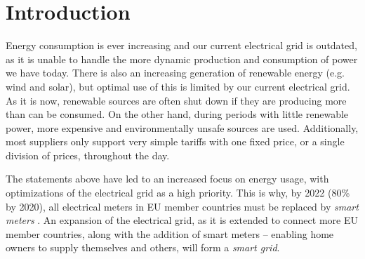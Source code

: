 
\chapter*{Introduction}

Energy consumption is ever increasing and our current electrical grid is outdated, as it is unable to handle the more dynamic production and consumption of power we have today.
There is also an increasing generation of renewable energy (e.g. wind and solar), but optimal use of this is limited by our current electrical grid.
As it is now, renewable sources are often shut down if they are producing more than can be consumed.
On the other hand, during periods with little renewable power, more expensive and environmentally unsafe sources are used.
Additionally, most suppliers only support very simple tariffs with one fixed price, or a single division of prices, throughout the day.

The statements above have led to an increased focus on energy usage, with optimizations of the electrical grid as a high priority.
This is why, by 2022 (80\% by 2020), all  electrical meters in EU member countries must be replaced by \emph{smart meters} \cite{smart_meter_survey, directive_2009_72_EC}.
An expansion of the electrical grid, as it is extended to connect more EU member countries, along with the addition of smart meters -- enabling home owners to supply themselves and others, will form a \emph{smart grid}.
